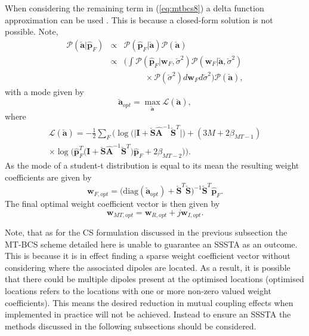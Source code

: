 \documentclass[10pt,final]{IEEEtran}
\begin{document}
When considering the remaining term in (\ref{eq:mtbcs8}) a delta function approximation can be used \cite{Oliveri12}.  This is because a closed-form solution is not possible.  Note,
\begin{eqnarray}\label{eq:mtbcs14}\nonumber
  \mathcal{P}(\breve{\textbf{a}}|\hat{\textbf{p}}_{F})&\propto&\mathcal{P}(\hat{\textbf{p}}_{F}|\breve{\textbf{a}})\mathcal{P}(\breve{\textbf{a}}) \\ \nonumber
  &\propto&\bigg(\int\mathcal{P}(\hat{\textbf{p}}_{F}|\textbf{w}_{F},\breve{\sigma}^{2})\mathcal{P}(\textbf{w}_{F}|\breve{\textbf{a}},\breve{\sigma}^{2})\\ &&\;\;\;\;\;\;\;\;\;\times\mathcal{P}(\breve{\sigma}^{2})d\textbf{w}_{F}d\breve{\sigma}^{2} \bigg)\mathcal{P}(\breve{\textbf{a}}),
\end{eqnarray}
with a mode given by
\begin{equation}\label{eq:mtbcs15}
  \breve{\textbf{a}}_{opt}=\max\limits_{\breve{\textbf{a}}}\mathcal{L}(\breve{\textbf{a}}),
\end{equation}
where\small
\begin{eqnarray}\label{eq:mtbcs16}\nonumber
  \mathcal{L}(\breve{\textbf{a}})=-\frac{1}{2}\sum\limits_{F}\Bigg(\log\bigg(\big|\textbf{I}+\breve{\textbf{S}}\hat{\textbf{A}}^{-1}\breve{\textbf{S}}^{T}\big| \bigg)+(3M+2\beta_{MT-1})\\ \times\log\bigg(\hat{\textbf{p}}^{T}_{F}\big(\textbf{I}+\breve{\textbf{S}}\hat{\textbf{A}}^{-1}\breve{\textbf{S}}^{T} \big)\hat{\textbf{p}}_{F}+2\beta_{MT-2} \bigg) \Bigg).
\end{eqnarray}\normalsize
As the mode of a student-t distribution is equal to its mean the resulting weight coefficients are given by \cite{Oliveri12}
\begin{equation}\label{eq:mtbcs17}
  \textbf{w}_{F,opt} = \bigg(\text{diag}(\breve{\textbf{a}}_{opt})+\breve{\textbf{S}}^{T}\breve{\textbf{S}} \bigg)^{-1}\breve{\textbf{S}}^{T}\hat{\textbf{p}}_{F}.
\end{equation}
The final optimal weight coefficient vector is then given by
\begin{equation}\label{eq:mtbcs}
  \textbf{w}_{MT,opt} = \textbf{w}_{R,opt}+j\textbf{w}_{I,opt}.
\end{equation}

Note, that as for the CS formulation discussed in the previous subsection the MT-BCS scheme detailed here is unable to guarantee an SSSTA as an outcome.  This is because it is in effect finding a sparse weight coefficient vector without considering where the associated dipoles are located.  As a result, it is possible that there could be multiple dipoles present at the optimised locations (optimised locations refers to the locations with one or more non-zero valued weight coefficients).  This means the desired reduction in mutual coupling effects when implemented in practice will not be achieved.  Instead to ensure an SSSTA the methods discussed in the following subsections should be considered.
\end{document}
